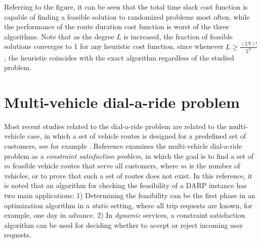 \documentclass[dissertation,draft*]{aaltoseries}
\begin{document}


Referring to the figure, it can be seen that the total time slack cost function is capable of finding
a feasible solution to randomized problems most often, while the performance of the route duration cost
function is worst of the three algorithms. Note that as the degree $L$ is increased, 
the fraction of feasible solutions converges to 1 for any heuristic cost function, since whenever $L \geq \frac{(2N)!}{2^N}$,
the heuristic coincides with the exact algorithm regardless of the studied problem.



\section{Multi-vehicle dial-a-ride problem}
\label{multivehicle}
Most recent studies related to the dial-a-ride problem are related to the multi-vehicle case, in which 
a set of vehicle routes is designed for a predefined set of customers, see for example 
\cite{cordeau02, cordeau01, bent, ropke, xiang2006, melachrinoudis, parragh, garaix, berbegliathesis,berbegliafeas,berbegliapdp}.
Reference \cite{berbegliafeas} examines the multi-vehicle dial-a-ride problem as a \emph{constraint satisfaction problem}, in which the goal
is to find a set of $m$ feasible vehicle routes that serve all customers, where $m$ is the 
number of vehicles, or to prove that such a set of routes does not exist.
In this reference, it is noted that 
an algorithm for checking the feasibility of a DARP instance has two main applications:  
1) Determining the feasibility can be the first phase in an 
optimization algorithm in a \emph{static} setting, where all trip requests are known, for example, one day in advance. 
2) In \emph{dynamic} services, a constraint satisfaction algorithm can be used 
for deciding whether to accept or reject incoming user requests. 
% 
\end{document}
